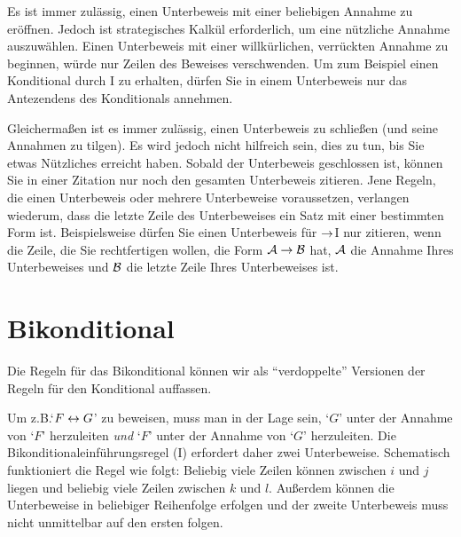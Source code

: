 Es ist immer zulässig, einen Unterbeweis mit einer beliebigen Annahme zu eröffnen. Jedoch ist strategisches Kalkül erforderlich, um eine nützliche Annahme auszuwählen. Einen Unterbeweis mit einer willkürlichen, verrückten Annahme zu beginnen, würde nur Zeilen des Beweises verschwenden. Um zum Beispiel einen Konditional durch {\eif}I zu erhalten, dürfen Sie in einem Unterbeweis nur das Antezendens des Konditionals annehmen. 

Gleicherma{\ss}en ist es immer zulässig, einen Unterbeweis zu schlie{\ss}en (und seine Annahmen zu tilgen). Es wird jedoch nicht hilfreich sein, dies zu tun, bis Sie etwas Nützliches erreicht haben. Sobald der Unterbeweis geschlossen ist, können Sie in einer Zitation nur noch den gesamten Unterbeweis zitieren. Jene Regeln, die einen Unterbeweis oder mehrere Unterbeweise voraussetzen, verlangen wiederum, dass die letzte Zeile des Unterbeweises ein Satz mit einer bestimmten Form ist. Beispielsweise dürfen Sie einen Unterbeweis für $\rightarrow$I nur zitieren, wenn die Zeile, die Sie rechtfertigen wollen, die Form $\mathcal{A} \rightarrow \mathcal{B}$ hat, $\mathcal{A}$ die Annahme Ihres Unterbeweises und $\mathcal{B}$ die letzte Zeile Ihres Unterbeweises ist.

\section{Bikonditional}
Die Regeln für das Bikonditional können wir als ``verdoppelte'' Versionen der Regeln für den Konditional auffassen.

Um z.B.\@ `$F \leftrightarrow G$' zu beweisen, muss man in der Lage sein, `$G$' unter der Annahme von `$F$' herzuleiten \emph{und} `$F$' unter der Annahme von `$G$' herzuleiten. Die Bikonditionaleinführungsregel ({\eiff}I) erfordert daher zwei Unterbeweise. Schematisch funktioniert die Regel wie folgt: 
Beliebig viele Zeilen können zwischen $i$ und $j$ liegen und beliebig viele Zeilen zwischen $k$ und $l$. Au{\ss}erdem können die Unterbeweise in beliebiger Reihenfolge erfolgen und der zweite Unterbeweis muss nicht unmittelbar auf den ersten folgen.

